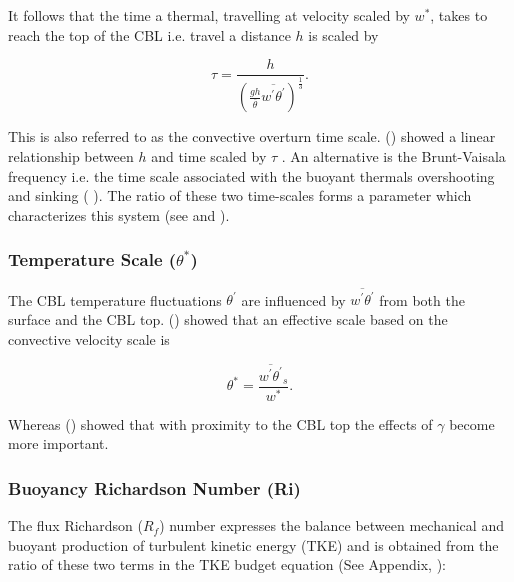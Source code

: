 It follows that the time a thermal, travelling at velocity scaled by $w^{*}$, takes to reach the top of the \acs{CBL} i.e. travel a distance $h$ is scaled by

\begin{equation}
\tau = \frac{h}{\left( \frac{gh}{\overline{\theta}}\overline{w^{'}\theta^{'}} \right)^{\frac{1}{3}}}.
\end{equation}

 This is also referred to as the convective overturn time scale.  \citeauthor{SullMoengStev} (\citeyear{SullMoengStev}) 
showed a linear relationship between $h$ and time scaled by $\tau$ . An alternative is the Brunt-Vaisala frequency i.e. the time scale
 associated with the buoyant thermals overshooting and sinking (\citeauthor{FedConzMir04} \citeyear{FedConzMir04}).  The ratio of these two time-scales forms a parameter which characterizes this system (see \citeauthor{Sorbjan}\citeyear{Sorbjan} and \citeauthor{Deardorff79} \citeyear{Deardorff79}). 

\subsubsection{Temperature Scale ($\theta^{*}$)}
\label{subsubsec:}

The \acs{CBL} temperature fluctuations $\theta^{'}$ are influenced by $\overline{w^{'}\theta^{'}}$ from both the surface and the \acs{CBL} top.
\citeauthor {Deardorff70} (\citeyear{Deardorff70}) showed that an effective scale based on the convective velocity scale is

\begin{equation}
\theta^{*} = \frac{\overline{w^{'}\theta^{'}}_{s}}{w^{*}}.
\end{equation} 

Whereas \citeauthor{Sorbjan} (\citeyear{Sorbjan}) showed that with proximity to the \acs{CBL} top the effects of $\gamma$ become more important.
 
\subsubsection{Buoyancy Richardson Number (\acs{Ri})}
\label{subsubsec:}

The flux Richardson ($R_{f}$) number expresses the balance between mechanical and buoyant production of turbulent kinetic energy (\acs{TKE}) and is obtained from the ratio of these two terms in the \acs{TKE} budget equation (See Appendix, \citeauthor{Stull-BLMetIntro} \citeyear{Stull-BLMetIntro}):

